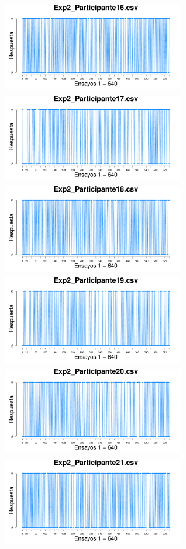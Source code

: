 \documentclass[a4paper ]{article}
\begin{document}
\begin{figure}[th]
\begin{center}
\includegraphics[width=8cm, height=4cm]{Figures/Response_Exp2_P16} \includegraphics[width=8cm, height=4cm]{Figures/Response_Exp2_P17} \includegraphics[width=8cm, height=4cm]{Figures/Response_Exp2_P18}
\includegraphics[width=8cm, height=4cm]{Figures/Response_Exp2_P19} \includegraphics[width=8cm, height=4cm]{Figures/Response_Exp2_P20} \includegraphics[width=8cm, height=4cm]{Figures/Response_Exp2_P21} 
\end{center}
\end{figure}
\clearpage
\end{document}
